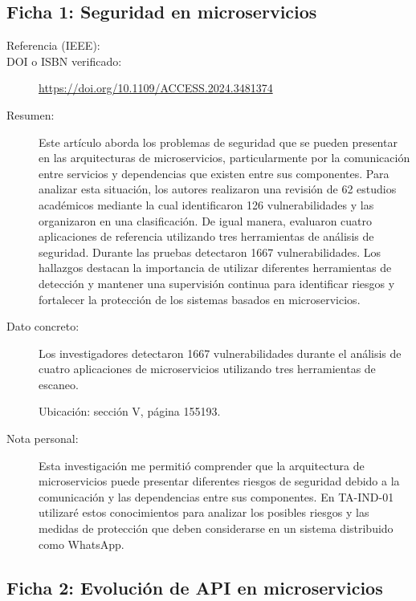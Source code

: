 

\subsection{Ficha 1: Seguridad en microservicios}

\begin{description}

\item[Referencia (IEEE):]

\item[DOI o ISBN verificado:]
\url{https://doi.org/10.1109/ACCESS.2024.3481374}

\item[Resumen:]
Este artículo aborda los problemas de seguridad que se pueden presentar en las arquitecturas de microservicios, particularmente por la comunicación entre servicios y dependencias que existen entre sus componentes. Para analizar esta situación, los autores realizaron una revisión de 62 estudios académicos mediante la cual identificaron 126 vulnerabilidades y las organizaron en una clasificación. De igual manera, evaluaron cuatro aplicaciones de referencia utilizando tres herramientas de análisis de seguridad. Durante las pruebas detectaron 1667 vulnerabilidades. Los hallazgos destacan la importancia de utilizar diferentes herramientas de detección y mantener una supervisión continua para identificar riesgos y fortalecer la protección de los sistemas basados en microservicios.

\item[Dato concreto:]
Los investigadores detectaron 1667 vulnerabilidades durante el análisis de cuatro aplicaciones de microservicios utilizando tres herramientas de escaneo.

Ubicación: sección V, página 155193.

\item[Nota personal:]
Esta investigación me permitió comprender que la arquitectura de microservicios puede presentar diferentes riesgos de seguridad debido a la comunicación y las dependencias entre sus componentes. En TA-IND-01 utilizaré estos conocimientos para analizar los posibles riesgos y las medidas de protección que deben considerarse en un sistema distribuido como WhatsApp.

\end{description}



\subsection{Ficha 2: Evolución de API en microservicios}

